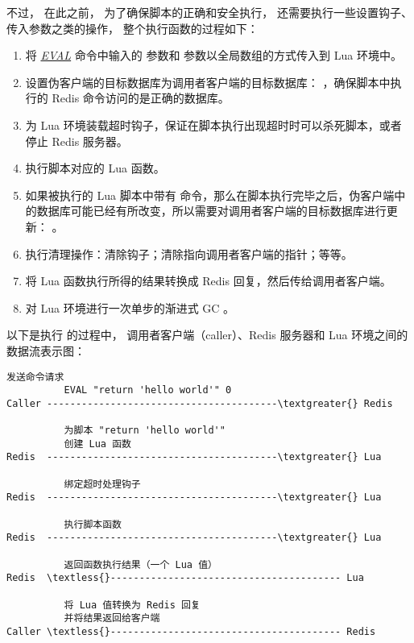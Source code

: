 \documentclass[a4paper,11pt,english]{sphinxmanual}
\begin{document}
不过，
在此之前，
为了确保脚本的正确和安全执行，
还需要执行一些设置钩子、传入参数之类的操作，
整个执行函数的过程如下：
\begin{enumerate}
\item {} 
将 \href{http://redis.readthedocs.org/en/latest/script/eval.html\#eval}{\emph{EVAL}} 命令中输入的  参数和  参数以全局数组的方式传入到 Lua 环境中。

\item {} 
设置伪客户端的目标数据库为调用者客户端的目标数据库：  ，确保脚本中执行的 Redis 命令访问的是正确的数据库。

\item {} 
为 Lua 环境装载超时钩子，保证在脚本执行出现超时时可以杀死脚本，或者停止 Redis 服务器。

\item {} 
执行脚本对应的 Lua 函数。

\item {} 
如果被执行的 Lua 脚本中带有  命令，那么在脚本执行完毕之后，伪客户端中的数据库可能已经有所改变，所以需要对调用者客户端的目标数据库进行更新：  。

\item {} 
执行清理操作：清除钩子；清除指向调用者客户端的指针；等等。

\item {} 
将 Lua 函数执行所得的结果转换成 Redis 回复，然后传给调用者客户端。

\item {} 
对 Lua 环境进行一次单步的渐进式 GC 。

\end{enumerate}

以下是执行  的过程中，
调用者客户端（caller）、Redis 服务器和 Lua 环境之间的数据流表示图：

\begin{Verbatim}[commandchars=\\\{\}]
          发送命令请求
          EVAL "return 'hello world'" 0
Caller ----------------------------------------\textgreater{} Redis

          为脚本 "return 'hello world'"
          创建 Lua 函数
Redis  ----------------------------------------\textgreater{} Lua

          绑定超时处理钩子
Redis  ----------------------------------------\textgreater{} Lua

          执行脚本函数
Redis  ----------------------------------------\textgreater{} Lua

          返回函数执行结果（一个 Lua 值）
Redis  \textless{}---------------------------------------- Lua

          将 Lua 值转换为 Redis 回复
          并将结果返回给客户端
Caller \textless{}---------------------------------------- Redis
\end{Verbatim}
\end{document}
